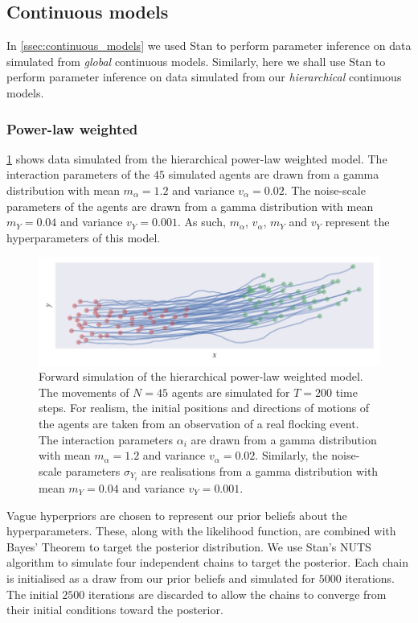 \subsection{Continuous models}

In \cref{ssec:continuous_models} we used Stan to perform parameter inference on
data simulated from \emph{global} continuous models. Similarly, here we shall
use Stan to perform parameter inference on data simulated from our
\emph{hierarchical} continuous models.

\subsubsection{Power-law weighted}

\cref{fig:power_hier_sim} shows data simulated from the hierarchical power-law
weighted model. The interaction parameters of the $45$ simulated agents are
drawn from a gamma distribution with mean $m_{\alpha}=1.2$ and variance
$v_{\alpha}=0.02$. The noise-scale parameters of the agents are drawn from a
gamma distribution with mean $m_Y=0.04$ and variance $v_Y=0.001$. As such,
$m_{\alpha}$, $v_{\alpha}$, $m_Y$ and $v_Y$ represent the hyperparameters of
this model.

\begin{figure}[tbp]
  \includegraphics{power_hier_sim.pdf}
  \caption{Forward simulation of the hierarchical power-law weighted model. The
    movements of $N=45$ agents are simulated for $T=200$ time steps. For
    realism, the initial positions and directions of motions of the agents
    are taken from an observation of a real flocking event. The interaction
    parameters $\alpha_i$ are drawn from a gamma distribution with mean
    $m_{\alpha}=1.2$ and variance $v_{\alpha}=0.02$. Similarly, the
    noise-scale parameters $\sigma_{Y_i}$ are realisations from a gamma
    distribution with mean $m_Y=0.04$ and variance $v_Y=0.001$.}
  \label{fig:power_hier_sim}
\end{figure}

Vague hyperpriors are chosen to represent our prior beliefs about the
hyperparameters. These, along with the likelihood function, are combined with
Bayes' Theorem to target the posterior distribution. We use Stan's NUTS
algorithm to simulate four independent chains to target the posterior. Each
chain is initialised as a draw from our prior beliefs and simulated for $5000$
iterations. The initial $2500$ iterations are discarded to allow the chains to
converge from their initial conditions toward the posterior.

